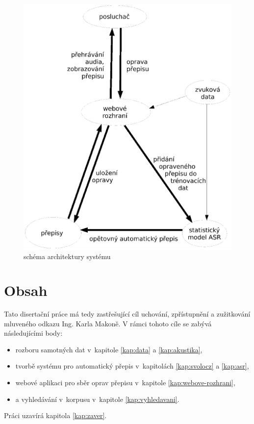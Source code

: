\begin{figure}[htpb]
\includegraphics[scale=1.0]{rc/arch.eps}
\caption{schéma architektury systému}
\label{fig:arch}
\end{figure}

\section{Obsah}

Tato disertační práce má tedy zastřešující cíl uchování, zpřístupnění a
zužitkování mluveného odkazu Ing. Karla Makoně. V rámci tohoto cíle se zabývá
následujícími body:

\begin{itemize}
\item{rozboru samotných dat v~kapitole \ref{kap:data} a \ref{kap:akustika},}
\item{tvorbě systému pro automatický přepis v~kapitolách \ref{kap:svolocz} a \ref{kap:asr},}
\item{webové aplikaci pro sběr oprav přepisu v~kapitole \ref{kap:webove-rozhrani},}
\item{a vyhledávání v~korpusu v~kapitole \ref{kap:vyhledavani}.}
\end{itemize}

Práci uzavírá kapitola \ref{kap:zaver}.
